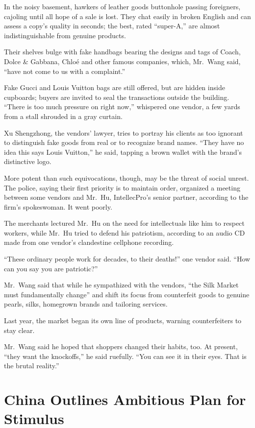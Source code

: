 \documentclass[12pt,a4paper,onecolumn]{article}
\begin{document}
\begin{CJK*}{GBK}{song}
In the noisy basement, hawkers of leather goods buttonhole passing foreigners, cajoling until all
hope of a sale is lost. They chat easily in broken English and can assess a copy's quality in
seconds; the best, rated ``super-A,'' are almost indistinguishable from genuine products.

Their shelves bulge with fake handbags bearing the designs and tags of Coach, Dolce \& Gabbana,
Chlo\'e and other famous companies, which, Mr.~Wang said, ``have not come to us with a complaint.''

Fake Gucci and Louis Vuitton bags are still offered, but are hidden inside cupboards; buyers are
invited to seal the transactions outside the building. ``There is too much pressure on right now,''
whispered one vendor, a few yards from a stall shrouded in a gray curtain.

Xu Shengzhong, the vendors' lawyer, tries to portray his clients as too ignorant to distinguish fake
goods from real or to recognize brand names. ``They have no idea this says Louis Vuitton,'' he said,
tapping a brown wallet with the brand's distinctive logo.

More potent than such equivocations, though, may be the threat of social unrest. The police, saying
their first priority is to maintain order, organized a meeting between some vendors and Mr.~Hu,
IntellecPro's senior partner, according to the firm's spokeswoman. It went poorly.

The merchants lectured Mr.~Hu on the need for intellectuals like him to respect workers, while
Mr.~Hu tried to defend his patriotism, according to an audio CD made from one vendor's clandestine
cellphone recording.

``These ordinary people work for decades, to their deaths!'' one vendor said. ``How can you say you
are patriotic?''

Mr.~Wang said that while he sympathized with the vendors, ``the Silk Market must fundamentally
change'' and shift its focus from counterfeit goods to genuine pearls, silks, homegrown brands and
tailoring services.

Last year, the market began its own line of products, warning counterfeiters to stay clear.

Mr.~Wang said he hoped that shoppers changed their habits, too. At present, ``they want the
knockoffs,'' he said ruefully. ``You can see it in their eyes. That is the brutal reality.''

\section{China Outlines Ambitious Plan for Stimulus}


\end{CJK*}
\end{document}
